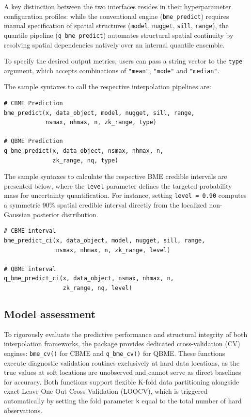A key distinction between the two interfaces resides in their hyperparameter configuration profiles: while the conventional engine (\texttt{bme\_predict}) requires manual specification of spatial structures (\texttt{model}, \texttt{nugget}, \texttt{sill}, \texttt{range}), the quantile pipeline (\texttt{q\_bme\_predict}) automates structural spatial continuity by resolving spatial dependencies natively over an internal quantile ensemble.

To specify the desired output metrics, users can pass a string vector to the \texttt{type} argument, which accepts combinations of \texttt{"mean"}, \texttt{"mode"} and \texttt{"median"}.

The sample syntaxes to call the respective interpolation pipelines are:

\begin{verbatim}
# CBME Prediction 
bme_predict(x, data_object, model, nugget, sill, range, 
            nsmax, nhmax, n, zk_range, type)

# QBME Prediction 
q_bme_predict(x, data_object, nsmax, nhmax, n, 
              zk_range, nq, type)
\end{verbatim}

The sample syntaxes to calculate the respective BME credible intervals are presented below, where the \texttt{level} parameter defines the targeted probability mass for uncertainty quantification. For instance, setting \texttt{level\ =\ 0.90} computes a symmetric \(90\%\) spatial credible interval directly from the localized non-Gaussian posterior distribution.

\begin{verbatim}
# CBME interval 
bme_predict_ci(x, data_object, model, nugget, sill, range, 
               nsmax, nhmax, n, zk_range, level)

# QBME interval 
q_bme_predict_ci(x, data_object, nsmax, nhmax, n, 
                 zk_range, nq, level)
\end{verbatim}

\subsection{Model assessment}\label{model-assessment}

To rigorously evaluate the predictive performance and structural integrity of both interpolation frameworks, the package provides dedicated cross-validation (CV) engines: \texttt{bme\_cv()} for CBME and \texttt{q\_bme\_cv()} for QBME. These functions execute diagnostic validation routines exclusively at hard data locations, as the true values at soft locations are unobserved and cannot serve as direct baselines for accuracy. Both functions support flexible K-fold data partitioning alongside exact Leave-One-Out Cross-Validation (LOOCV), which is triggered automatically by setting the fold parameter \texttt{k} equal to the total number of hard observations.

